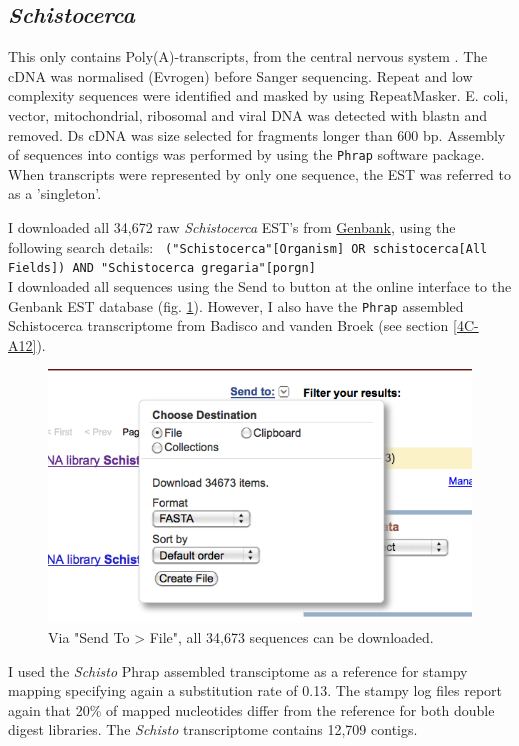 \documentclass{article}\usepackage[]{graphicx}\usepackage[]{color}
\begin{document}
\subsection{\textit{Schistocerca}}

This only contains Poly(A)-transcripts, from the central nervous system \citep{Badisco2011}. The cDNA was normalised (Evrogen) before Sanger sequencing. Repeat and low complexity sequences were identified and masked by using \textsf{RepeatMasker}. E. coli, vector, mitochondrial, ribosomal and viral DNA was detected with \textsf{blastn} and removed. Ds cDNA was size selected for fragments longer than 600 bp. Assembly of sequences into contigs was performed by using the \texttt{Phrap} software package. When transcripts were represented by only one sequence, the EST was referred to as a 'singleton'.

I downloaded all 34,672 raw \textit{Schistocerca} EST's from \href{http://www.ncbi.nlm.nih.gov/nucest}{Genbank}, using the following search details:
\verb! ("Schistocerca"[Organism] OR schistocerca[All Fields]) AND "Schistocerca gregaria"[porgn] ! \\

I downloaded all sequences using the \textsf{Send to} button at the online interface to the Genbank EST database (fig. \ref{SendTo}).
However, I also have the \texttt{Phrap} assembled Schistocerca transcriptome from Badisco and vanden Broek (see section \ref{4C-A12}).

\begin{figure}
\centering
\includegraphics[width=.8\textwidth]{./figure/Schistocerca-EST-download}
\caption{Via "Send To > File", all 34,673 sequences can be downloaded.}
\label{SendTo}
\end{figure}

I used the \textit{Schisto} Phrap assembled transciptome as a reference for stampy mapping specifying again a substitution rate of 0.13. The stampy log files report again that 20\% of mapped nucleotides differ from the reference for both double digest libraries. The \textit{Schisto} transcriptome contains 12,709 contigs.
\end{document}
